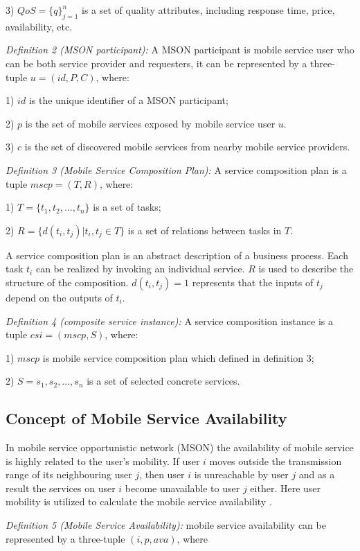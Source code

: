 \documentclass[10pt,journal,compsoc]{IEEEtran}
\begin{document}
​3) $QoS = \{q\}^n_{j=1}$ is a set of quality attributes, including response time, price, availability, etc.

\textit{Definition 2 (MSON participant):} A MSON participant is mobile service user who can be both service provider and requesters, it can be represented by a three-tuple $u = (id, P, C)$, where:

​1) $id$ is the unique identifier of a MSON participant;

​2) $p$ is the set of mobile services exposed by mobile service user $u$.

​3) $c$ is the set of discovered mobile services from nearby mobile service providers.

\textit{Definition 3 (Mobile Service Composition Plan):} A service composition plan is a tuple $mscp = (T, R)$, where:

​1) $T = \{t_1,t_2,…,t_n\}$ is a set of tasks;

​2) $R = \{d(t_i,t_j)|t_i,t_j \in T\}$ is a set of relations between tasks in $T$.

​A service composition plan is an abstract description of a business process. Each task $t_i$ can be realized by invoking an individual service. $R$ is used to describe the structure of the composition. $d(t_i, t_j) = 1$ represents that the inputs of $t_j$ depend on the outputs of $t_i$.

\textit{Definition 4 (composite service instance):} A service composition instance is a tuple $csi = (mscp, S)$, where:

​1) $mscp$ is mobile service composition plan which defined in definition 3;

​2) $S = {s_1, s_2,…,s_n}$ is a set of selected concrete services.

\subsection{Concept of Mobile Service Availability}
In mobile service opportunistic network (MSON) the availability of mobile service is highly related to the user’s mobility. If user $i$ moves outside the transmission range of its neighbouring user $j$, then user $i$ is unreachable by user $j$ and as a result the services on user $i$ become unavailable to user $j$ either. Here user mobility is utilized to calculate the mobile service availability \cite{Yang2010}.

\textit{Definition 5 (Mobile Service Availability):} mobile service availability can be represented by a three-tuple $(i, p, ava) $, where
\end{document}

